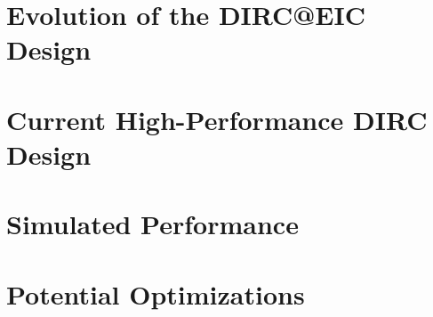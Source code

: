 \section{Evolution of the DIRC@EIC Design}
\section{Current High-Performance DIRC Design}
\section{Simulated Performance}
\section{Potential Optimizations}